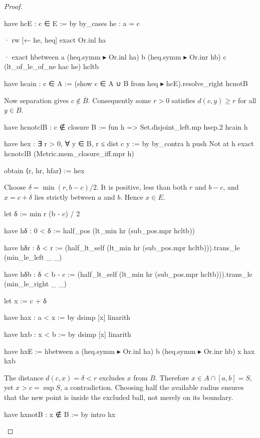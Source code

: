 \begin{proof}
\begin{lean}
    have hcE : c ∈ E := by
      by_cases he : a = c

      · rw [← he, heq]
        exact Or.inl ha

      · exact hbetween a (heq.symm ▸ Or.inl ha) b (heq.symm ▸ Or.inr hb) c
          (lt_of_le_of_ne hac he) hcltb

    have hcain : c ∈ A := (show c ∈ A ∪ B from heq ▸ hcE).resolve_right hcnotB
  \end{lean}

  Now separation gives $c\notin\overline B$.
  Consequently some $r>0$ satisfies $d(c,y)\geq r$ for all $y\in B$.

  \begin{lean}
    have hcnotclB : c ∉ closure B := fun h => Set.disjoint_left.mp hsep.2 hcain h

    have hex : ∃ r > 0, ∀ y ∈ B, r ≤ dist c y := by
      by_contra h
      push Not at h
      exact hcnotclB (Metric.mem_closure_iff.mpr h)

    obtain ⟨r, hr, hfar⟩ := hex
  \end{lean}

  Choose $\delta=\min(r,b-c)/2$.
  It is positive, less than both $r$ and $b-c$, and $x=c+\delta$ lies strictly between $a$ and $b$.
  Hence $x\in E$.

  \begin{lean}
    let δ := min r (b - c) / 2

    have hδ : 0 < δ := half_pos (lt_min hr (sub_pos.mpr hcltb))

    have hδr : δ < r := (half_lt_self (lt_min hr (sub_pos.mpr hcltb))).trans_le (min_le_left _ _)

    have hδb : δ < b - c := (half_lt_self (lt_min hr (sub_pos.mpr hcltb))).trans_le (min_le_right _ _)

    let x := c + δ

    have hax : a < x := by
      dsimp [x]
      linarith

    have hxb : x < b := by
      dsimp [x]
      linarith

    have hxE := hbetween a (heq.symm ▸ Or.inl ha) b (heq.symm ▸ Or.inr hb) x hax hxb
  \end{lean}

  The distance $d(c,x)=\delta<r$ excludes $x$ from $B$.
  Therefore $x\in A\cap[a,b]=S$, yet $x>c=\sup S$, a contradiction.
  Choosing half the available radius ensures that the new point is inside the excluded ball, not
  merely on its boundary.

  \begin{lean}
    have hxnotB : x ∉ B := by
      intro hx


\end{lean}
\end{proof}

